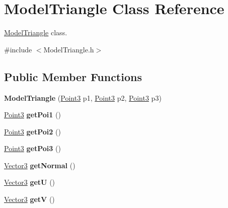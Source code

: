 \hypertarget{classModelTriangle}{\section{Model\-Triangle Class Reference}
\label{classModelTriangle}
}


\hyperlink{classModelTriangle}{Model\-Triangle} class.  




{\ttfamily \#include $<$Model\-Triangle.\-h$>$}

\subsection*{Public Member Functions}
\begin{DoxyCompactItemize}
\item 
\hypertarget{classModelTriangle_a3b2ac79093da14584d79f3049ad8a0f4}{{\bfseries Model\-Triangle} (\hyperlink{classVectormath_1_1Aos_1_1Point3}{Point3} p1, \hyperlink{classVectormath_1_1Aos_1_1Point3}{Point3} p2, \hyperlink{classVectormath_1_1Aos_1_1Point3}{Point3} p3)}\label{classModelTriangle_a3b2ac79093da14584d79f3049ad8a0f4}

\item 
\hypertarget{classModelTriangle_acb54b4fc644479eca37b6fd31503d126}{\hyperlink{classVectormath_1_1Aos_1_1Point3}{Point3} {\bfseries get\-Poi1} ()}\label{classModelTriangle_acb54b4fc644479eca37b6fd31503d126}

\item 
\hypertarget{classModelTriangle_ae393207cd8e9232a4bf519a6031eaaea}{\hyperlink{classVectormath_1_1Aos_1_1Point3}{Point3} {\bfseries get\-Poi2} ()}\label{classModelTriangle_ae393207cd8e9232a4bf519a6031eaaea}

\item 
\hypertarget{classModelTriangle_a5a3f447e5387491a998703276e7ea11a}{\hyperlink{classVectormath_1_1Aos_1_1Point3}{Point3} {\bfseries get\-Poi3} ()}\label{classModelTriangle_a5a3f447e5387491a998703276e7ea11a}

\item 
\hypertarget{classModelTriangle_a6026feeb8053278eee9ac78a576e2161}{\hyperlink{classVectormath_1_1Aos_1_1Vector3}{Vector3} {\bfseries get\-Normal} ()}\label{classModelTriangle_a6026feeb8053278eee9ac78a576e2161}

\item 
\hypertarget{classModelTriangle_a2961e48d38e1ac1ce0efa59e802f7e01}{\hyperlink{classVectormath_1_1Aos_1_1Vector3}{Vector3} {\bfseries get\-U} ()}\label{classModelTriangle_a2961e48d38e1ac1ce0efa59e802f7e01}

\item 
\hypertarget{classModelTriangle_a38c7778fe7c30857c769ccc70c8fb85c}{\hyperlink{classVectormath_1_1Aos_1_1Vector3}{Vector3} {\bfseries get\-V} ()}\label{classModelTriangle_a38c7778fe7c30857c769ccc70c8fb85c}

\end{DoxyCompactItemize}


